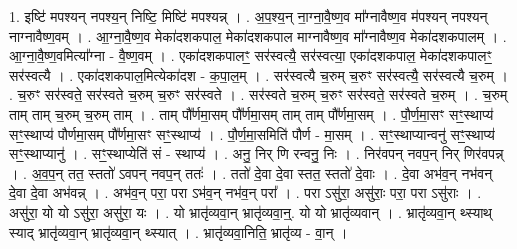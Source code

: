 \documentclass[17pt]{extarticle}
\begin{document}
1. इष्टि॑ मपश्यन् नपश्य॒न् निष्टि॒ मिष्टि॑ मपश्यन्न् । . अ॒प॒श्य॒न् ना॒ग्ना॒वै॒ष्ण॒व मा᳚ग्नावैष्ण॒व म॑पश्यन् नपश्यन् नाग्नावैष्ण॒वम् । . आ॒ग्ना॒वै॒ष्ण॒व मेका॑दशकपाल॒ मेका॑दशकपाल माग्नावैष्ण॒व मा᳚ग्नावैष्ण॒व मेका॑दशकपालम् । . आ॒ग्ना॒वै॒ष्ण॒वमित्या᳚ग्ना - वै॒ष्ण॒वम् । . एका॑दशकपालꣳ॒॒ सर॑स्वत्यै॒ सर॑स्वत्या॒ एका॑दशकपाल॒ मेका॑दशकपालꣳ॒॒ सर॑स्वत्यै । . एका॑दशकपाल॒मित्येका॑दश - क॒पा॒ल॒म् । . सर॑स्वत्यै च॒रुम् च॒रुꣳ सर॑स्वत्यै॒ सर॑स्वत्यै च॒रुम् । . च॒रुꣳ सर॑स्वते॒ सर॑स्वते च॒रुम् च॒रुꣳ सर॑स्वते । . सर॑स्वते च॒रुम् च॒रुꣳ सर॑स्वते॒ सर॑स्वते च॒रुम् । . च॒रुम् ताम् ताम् च॒रुम् च॒रुम् ताम् । . ताम् पौ᳚र्णमा॒सम् पौ᳚र्णमा॒सम् ताम् ताम् पौ᳚र्णमा॒सम् । . पौ॒र्ण॒मा॒सꣳ सꣳ॒॒स्थाप्य॑ सꣳ॒॒स्थाप्य॑ पौर्णमा॒सम् पौ᳚र्णमा॒सꣳ सꣳ॒॒स्थाप्य॑ । . पौ॒र्ण॒मा॒समिति॑ पौर्ण - मा॒सम् । . सꣳ॒॒स्थाप्यान्वनु॑ सꣳ॒॒स्थाप्य॑ सꣳ॒॒स्थाप्यानु॑ । . सꣳ॒॒स्थाप्येति॑ सं - स्थाप्य॑ । . अनु॒ निर् णि रन्वनु॒ निः । . निर॑वपन् नवप॒न् निर् णिर॑वपन्न् । . अ॒व॒प॒न् तत॒ स्ततो॑ ऽवपन् नवप॒न् ततः॑ । . ततो॑ दे॒वा दे॒वा स्तत॒ स्ततो॑ दे॒वाः । . दे॒वा अभ॑व॒न् नभ॑वन् दे॒वा दे॒वा अभ॑वन्न् । . अभ॑व॒न् परा॒ परा ऽभ॑व॒न् नभ॑व॒न् परा᳚ । . परा ऽसु॑रा॒ असु॑राः॒ परा॒ परा ऽसु॑राः । . असु॑रा॒ यो यो ऽसु॑रा॒ असु॑रा॒ यः । . यो भ्रातृ॑व्यवा॒न् भ्रातृ॑व्यवा॒न्॒. यो यो भ्रातृ॑व्यवान् । . भ्रातृ॑व्यवा॒न् थ्स्याथ् स्याद् भ्रातृ॑व्यवा॒न् भ्रातृ॑व्यवा॒न् थ्स्यात् । . भ्रातृ॑व्यवा॒निति॒ भ्रातृ॑व्य - वा॒न् । \newline
\end{document}
